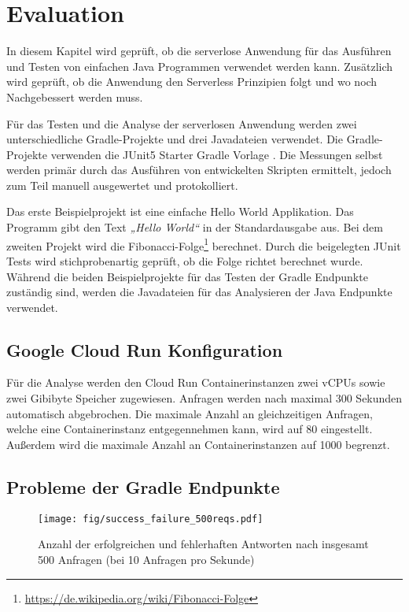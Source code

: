 \chapter{Evaluation}
In diesem Kapitel wird geprüft, ob die serverlose Anwendung
für das Ausführen und Testen von einfachen Java Programmen verwendet
werden kann. Zusätzlich wird geprüft, ob die Anwendung den Serverless Prinzipien folgt
und wo noch Nachgebessert werden muss.

Für das Testen und die Analyse der serverlosen Anwendung werden zwei unterschiedliche
Gradle-Projekte und drei Javadateien verwendet.
Die Gradle-Projekte verwenden die JUnit5 Starter Gradle Vorlage \cite{JunitStarterGradle}.
Die Messungen selbst werden primär durch das Ausführen von entwickelten Skripten
ermittelt, jedoch zum Teil manuell ausgewertet und protokolliert.

Das erste Beispielprojekt ist eine einfache
Hello World Applikation. Das Programm gibt den Text \emph{„Hello World“}
in der Standardausgabe aus. Bei dem zweiten Projekt wird
die Fibonacci-Folge\footnote{\url{https://de.wikipedia.org/wiki/Fibonacci-Folge}} berechnet.
Durch die beigelegten JUnit Tests wird stichprobenartig geprüft, ob die Folge richtet berechnet wurde.
Während die beiden Beispielprojekte für das Testen der Gradle Endpunkte zuständig sind,
werden die Javadateien für das Analysieren der Java Endpunkte verwendet.

\section{Google Cloud Run Konfiguration}
Für die Analyse werden den Cloud Run Containerinstanzen zwei vCPUs sowie zwei Gibibyte Speicher
zugewiesen. Anfragen werden nach maximal 300 Sekunden automatisch abgebrochen.
Die maximale Anzahl an gleichzeitigen Anfragen, welche eine Containerinstanz
entgegennehmen kann, wird auf 80 eingestellt. Außerdem wird die maximale Anzahl an Containerinstanzen
auf 1000 begrenzt.

\section{Probleme der Gradle Endpunkte}
\begin{figure}
  \centering
  \texttt{[image: fig/success\_failure\_500reqs.pdf]}
  \caption{Anzahl der erfolgreichen und fehlerhaften Antworten nach insgesamt 500 Anfragen (bei 10 Anfragen pro Sekunde)}
  \label{fig:success_failure_fivehundred}
\end{figure}

